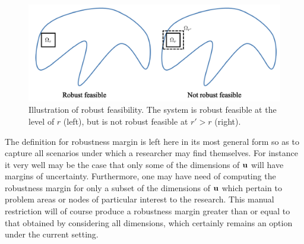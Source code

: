 \begin{figure}[htp!]
\begin{center}
\includegraphics[scale=1.1, bb=0in 0in 5in 2in]{Figures/RobFeas(revised).png} %
\end{center}
\caption{Illustration of robust feasibility.
The system is robust feasible at the level of $r$ (left), but is not robust feasible at $r' > r$ (right).}
\label{fig:RobFeas(r)}
\end{figure}

The definition for robustness margin is left here in its most general form so as to capture all scenarios under which a researcher may find themselves. 
For instance it very well may be the case that only some of the dimensions of $\mathbf{u}$ will have margins of uncertainty. 
Furthermore, one may have need of computing the robustness margin for only a subset of the dimensions of $\mathbf{u}$ which pertain to problem areas or nodes of particular interest to the research. 
This manual restriction will of course produce a robustness margin greater than or equal to that obtained by considering all dimensions, which certainly remains an option under the current setting. 
